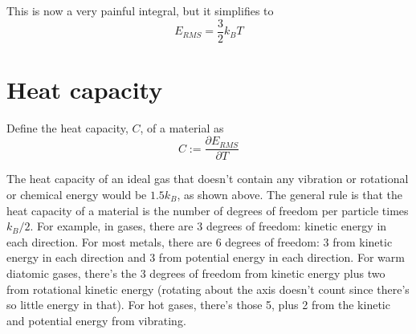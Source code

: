 \documentclass[12pt]{article}
\begin{document}
This is now a very painful integral, but it simplifies to
\[E_{RMS} = \frac{3}{2} k_B T\]

\section{Heat capacity}
Define the heat capacity, $C$, of a material as
\[C := \frac{\partial E_{RMS}}{\partial T} \]

The heat capacity of an ideal gas that doesn't contain any vibration or rotational or chemical energy would be $1.5 k_B$, as shown above. The general rule is that the heat capacity of a material is the number of degrees of freedom per particle times $k_B / 2$. For example, in gases, there are 3 degrees of freedom: kinetic energy in each direction. For most metals, there are 6 degrees of freedom: 3 from kinetic energy in each direction and 3 from potential energy in each direction. For warm diatomic gases, there's the 3 degrees of freedom from kinetic energy plus two from rotational kinetic energy (rotating about the axis doesn't count since there's so little energy in that). For hot gases, there's those 5, plus 2 from the kinetic and potential energy from vibrating.
\end{document}
